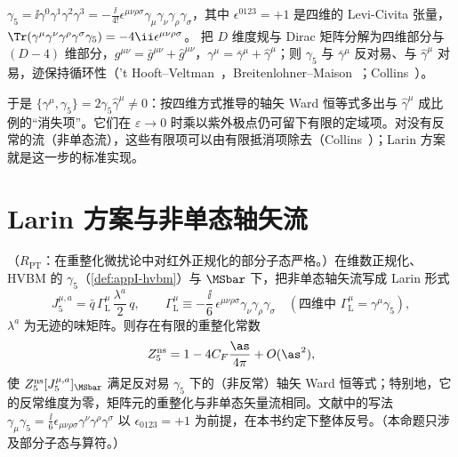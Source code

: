 \begin{definition}[HVBM 方案]\label{def:appI-hvbm}
$\gamma_5=\ii\gamma^0\gamma^1\gamma^2\gamma^3=-\frac{\ii}{4!}\epsilon^{\mu\nu\rho\sigma}\gamma_\mu\gamma_\nu\gamma_\rho\gamma_\sigma$，其中 $\epsilon^{0123}=+1$ 是四维的 Levi-Civita 张量，$\Tr(\gamma^\mu\gamma^\nu\gamma^\rho\gamma^\sigma\gamma_5)=-4\ii\epsilon^{\mu\nu\rho\sigma}$。%
把 $D$ 维度规与 Dirac 矩阵分解为四维部分与 $(D-4)$ 维部分，$g^{\mu\nu}=\bar g^{\mu\nu}+\hat g^{\mu\nu}$，$\gamma^\mu=\bar\gamma^\mu+\hat\gamma^\mu$；则 $\gamma_5$ 与 $\bar\gamma^\mu$ 反对易、与 $\hat\gamma^\mu$ 对易，迹保持循环性（'t Hooft--Veltman~\cite{tHooftVeltman1972}，Breitenlohner--Maison~\cite{BreitenlohnerMaison1977a}；Collins~\cite[第~13.2~节]{Collins1984}）。
\end{definition}

于是 $\{\gamma^\mu,\gamma_5\}=2\gamma_5\hat\gamma^\mu\ne0$：按四维方式推导的轴矢 Ward 恒等式多出与 $\hat\gamma^\mu$ 成比例的“消失项”。它们在 $\varepsilon\to0$ 时乘以紫外极点仍可留下有限的定域项。对没有反常的流（非单态流），这些有限项可以由有限抵消项除去（Collins~\cite[第~13.6~节]{Collins1984}）；Larin 方案就是这一步的标准实现。

\section{Larin 方案与非单态轴矢流}\label{sec:appI-larin}

\begin{proposition}\label{prop:appI-larin}
（$R_{\mathrm{PT}}$：在重整化微扰论中对红外正规化的部分子态严格。）在维数正规化、HVBM 的 $\gamma_5$（\cref{def:appI-hvbm}）与 $\MSbar$ 下，把非单态轴矢流写成 Larin 形式
\begin{equation}\label{eq:appI-larin-current}
J_5^{\mu,a}=\bar q\,\Gamma^\mu_{\mathrm L}\,\frac{\lambda^a}2\,q,\qquad \Gamma^\mu_{\mathrm L}\equiv-\frac{\ii}{6}\,\epsilon^{\mu\nu\rho\sigma}\gamma_\nu\gamma_\rho\gamma_\sigma\quad(\text{四维中 }\Gamma^\mu_{\mathrm L}=\gamma^\mu\gamma_5), %
\end{equation}
$\lambda^a$ 为无迹的味矩阵。则存在有限的重整化常数
\begin{equation}\label{eq:appI-Z5}
Z_5^{\mathrm{ns}}=1-4C_F\frac{\as}{4\pi}+O(\as^2), %
\end{equation}
使 $Z_5^{\mathrm{ns}}[J_5^{\mu,a}]_{\MSbar}$ 满足反对易 $\gamma_5$ 下的（非反常）轴矢 Ward 恒等式；特别地，它的反常维度为零，矩阵元的重整化与非单态矢量流相同。文献中的写法 $\gamma_\mu\gamma_5=\frac{\ii}6\epsilon_{\mu\nu\rho\sigma}\gamma^\nu\gamma^\rho\gamma^\sigma$ 以 $\epsilon_{0123}=+1$ 为前提，在本书约定下整体反号。（本命题只涉及部分子态与算符。）
\end{proposition}

